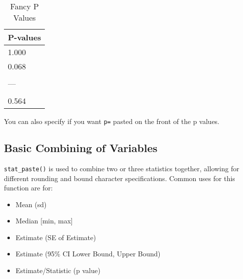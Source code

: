 \documentclass[table]{article}
\providecommand{\tightlist}{%
  \setlength{\itemsep}{0pt}\setlength{\parskip}{0pt}}
\begin{document}
\begin{table}[t]

\caption{\label{tab:7}Fancy P Values}
\centering
\begin{tabular}{l}
\hline
P-values\\
\hline
1.000\\
\hline
0.068\\
\hline
\cellcolor{yellow}{0.004}\\
\hline
---\\
\hline
\cellcolor{yellow}{<0.001}\\
\hline
0.564\\
\hline
\end{tabular}
\end{table}

You can also specify if you want \texttt{p=} pasted on the front of the
p values.

\hypertarget{basic-combining-of-variables}{%
\subsection{Basic Combining of
Variables}\label{basic-combining-of-variables}}

\texttt{stat\_paste()} is used to combine two or three statistics
together, allowing for different rounding and bound character
specifications. Common uses for this function are for:

\begin{itemize}
\tightlist
\item
  Mean (sd)
\item
  Median {[}min, max{]}
\item
  Estimate (SE of Estimate)
\item
  Estimate (95\% CI Lower Bound, Upper Bound)
\item
  Estimate/Statistic (p value)
\end{itemize}
\end{document}
